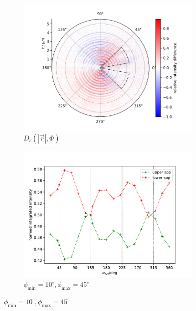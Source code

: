 \documentclass[titlepage,  ngerman]{article}
\begin{document}
\begin{figure}
			\begin{subfigure}[b]{0.5\textwidth}
				\centering
				\includegraphics[width=\textwidth]{figures/fp/fp_forw.png}
				\caption{$D_r\left(|\vec{r}|, \Phi\right)$}
				\label{fig:diff_fp_45_135_front}
			\end{subfigure}
			\hfill
			\begin{subfigure}[b]{0.49\textwidth}
				\centering
				\includegraphics[width=\textwidth]{figures/fp/fp_forw_int.pdf}
				\caption{ $\phi_\mathrm{min} =10^\circ, \phi_\mathrm{max}=45^\circ$}
				\label{fig:int_fp_45_135_front}
			\end{subfigure}

\end{figure}
\end{document}
